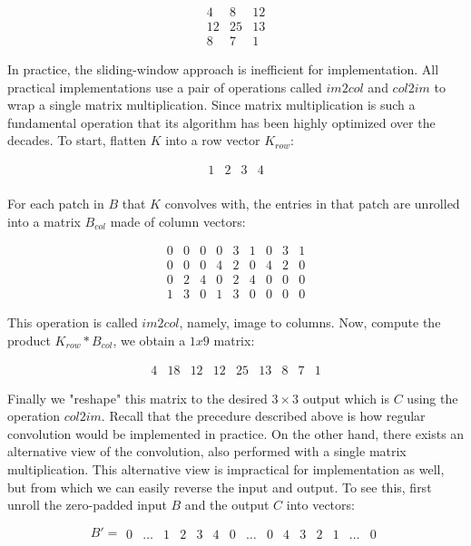 $$
\begin{matrix}
  4 & 8 & 12 \\
  12 & 25 & 13 \\
  8 & 7 & 1
\end{matrix}
$$

In practice, the sliding-window approach is inefficient for implementation. All practical implementations
use a pair of operations called $im2col$ and $col2im$ to wrap a single matrix multiplication. Since
matrix multiplication is such a fundamental operation that its algorithm has been highly optimized over the
decades. To start, flatten $K$ into a row vector $K_{row}$:

$$
\begin{matrix}
  1 & 2 & 3 & 4 \\
\end{matrix}
$$

For each patch in $B$ that $K$ convolves with, the entries in that patch are unrolled into a matrix $B_{col}$
made of column vectors:

$$
\begin{matrix}
  0 & 0 & 0 & 0 & 3 & 1 & 0 & 3 & 1 \\
  0 & 0 & 0 & 4 & 2 & 0 & 4 & 2 & 0 \\
  0 & 2 & 4 & 0 & 2 & 4 & 0 & 0 & 0 \\
  1 & 3 & 0 & 1 & 3 & 0 & 0 & 0 & 0
\end{matrix}
$$

This operation is called $im2col$, namely, image to columns. Now, compute the product $K_{row} * B_{col}$, we
obtain a $1x9$ matrix:

$$
\begin{matrix}
  4 & 18 & 12 & 12 & 25 & 13 & 8 & 7 & 1
\end{matrix}
$$

Finally we "reshape" this matrix to the desired $3 \times 3$ output which is $C$ using the operation $col2im$.
Recall that the precedure described above is how regular convolution would be implemented in practice.
On the other hand, there exists an alternative view of the convolution, also performed with a single
matrix multiplication. This alternative view is impractical for implementation as well, but from which
we can easily reverse the input and output. To see this, first unroll the zero-padded input $B$ and the output
$C$ into vectors:

\setcounter{MaxMatrixCols}{20}

$$
B' =
\begin{matrix}
  0 & \dots & 1 & 2 & 3 & 4 & 0 & \dots & 0 & 4 & 3 & 2 & 1 & \dots & 0
\end{matrix}
$$

